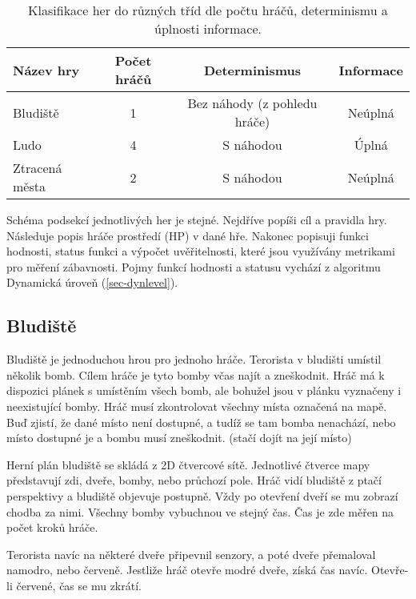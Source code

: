 \begin{table*}[b]\footnotesize
\vspace*{0mm}
\caption{{\label{tab:klasifikaceher}} Klasifikace her do různých tříd dle počtu hráčů, determinismu a úplnosti informace. }
\vspace*{0mm}
\label{shadowtable}
\begin{center}
\begin{tabular}{| l || c | c | c |}
\hline
Název hry & Počet hráčů & Determinismus & Informace \\
\hline
\hline
Bludiště & 1 & Bez náhody (z pohledu hráče) & Neúplná \\ \hline
Ludo & 4 & S náhodou & Úplná \\ \hline
Ztracená města & 2 & S náhodou & Neúplná \\ \hline
\end{tabular}
\end{center}
\end{table*}

Schéma podsekcí jednotlivých her je stejné. Nejdříve popíši cíl a pravidla hry. Následuje popis hráče prostředí (HP) v dané hře. Nakonec popisuji funkci hodnosti, status funkci a výpočet uvěřitelnosti, které jsou využívány metrikami pro měření zábavnosti. Pojmy funkcí hodnosti a statusu vychází z algoritmu Dynamická úroveň (\ref{sec-dynlevel}).

\subsection{Bludiště}

Bludiště je jednoduchou hrou pro jednoho hráče. Terorista v bludišti umístil několik bomb. Cílem hráče je tyto bomby včas najít a zneškodnit. Hráč má k dispozici plánek s umístěním všech bomb, ale bohužel jsou v plánku vyznačeny i neexistující bomby. Hráč musí zkontrolovat všechny místa označená na mapě. Buď zjistí, že dané místo není dostupné, a tudíž se tam bomba nenachází, nebo místo dostupné je a bombu musí zneškodnit. (stačí dojít na její místo) 

Herní plán bludiště se skládá z 2D čtvercové sítě. Jednotlivé čtverce mapy představují zdi, dveře, bomby, nebo průchozí pole. Hráč vidí bludiště z ptačí perspektivy a bludiště objevuje postupně. Vždy po otevření dveří se mu zobrazí chodba za nimi. Všechny bomby vybuchnou ve stejný čas. Čas je zde měřen na počet kroků hráče.

Terorista navíc na některé dveře připevnil senzory, a poté dveře přemaloval namodro, nebo červeně. Jestliže hráč otevře modré dveře, získá čas navíc. Otevře-li červené, čas se mu zkrátí.

